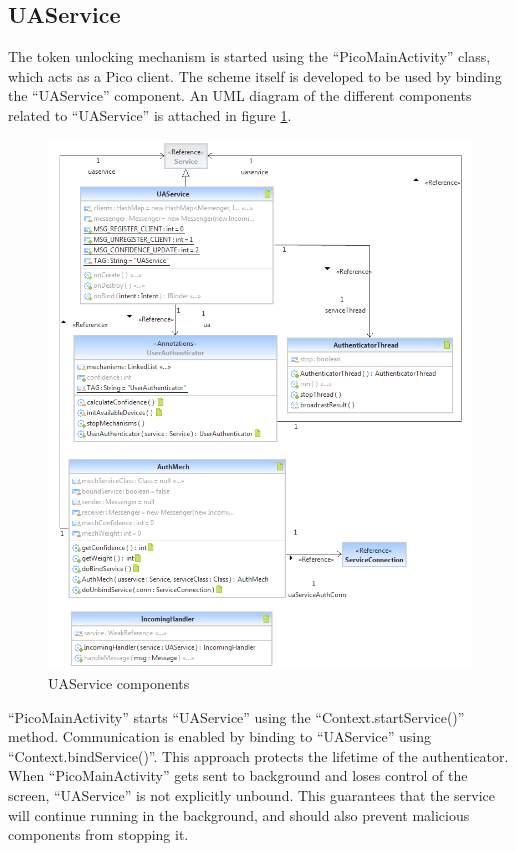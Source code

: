\subsection{UAService}
The token unlocking mechanism is started using the ``PicoMainActivity'' class, which acts as a Pico client. The scheme itself is developed to be used by binding the ``UAService'' component. An UML diagram of the different components related to ``UAService'' is attached in figure \ref{fig:uaservice}.
\begin{figure}[h]
    \centering
    \includegraphics[width=\textwidth]{Pictures/uaservice}
    \caption{UAService components}
    \label{fig:uaservice}
\end{figure}

``PicoMainActivity'' starts ``UAService'' using the ``Context.startService()'' method. Communication is enabled by binding to ``UAService'' using ``Context.bindService()''. This approach protects the lifetime of the authenticator. When ``PicoMainActivity'' gets sent to background and loses control of the screen, ``UAService'' is not explicitly unbound. This guarantees that the service will continue running in the background, and should also prevent malicious components from stopping it. 

